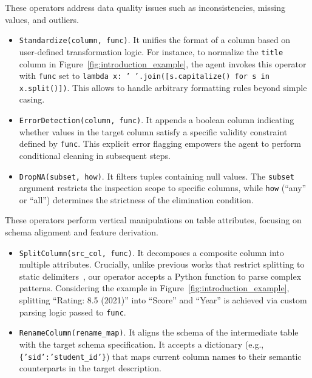  These operators address data quality issues such as inconsistencies, missing values, and outliers.
\begin{itemize}[leftmargin=1em]
    \item \texttt{Standardize(column, func)}. It unifies the format of a column based on user-defined transformation logic. For instance, to normalize the \texttt{title} column in Figure~\ref{fig:introduction_example}, the agent invokes this operator with \texttt{func} set to {\small\texttt{lambda x: ' '.join([s.capitalize() for s in x.split()])}}. This allows \sys to handle arbitrary formatting rules beyond simple casing.
    \item \texttt{ErrorDetection(column, func)}. It appends a boolean column indicating whether values in the target column satisfy a specific validity constraint defined by \texttt{func}. This explicit error flagging empowers the agent to perform conditional cleaning in subsequent steps.
    \item \texttt{DropNA(subset, how)}. It filters tuples containing null values. The \texttt{subset} argument restricts the inspection scope to specific columns, while \texttt{how} (``any'' or ``all'') determines the strictness of the elimination condition.
\end{itemize}


 These operators perform vertical manipulations on table attributes, focusing on schema alignment and feature derivation.
\begin{itemize}[leftmargin=1em]
    \item \texttt{SplitColumn(src\_col, func)}. It decomposes a composite column into multiple attributes. Crucially, unlike previous works that restrict splitting to static delimiters~\cite{yang2021auto}, our operator accepts a Python function to parse complex patterns. Considering the example in Figure~\ref{fig:introduction_example}, splitting ``Rating: 8.5 (2021)'' into ``Score'' and ``Year'' is achieved via custom parsing logic passed to \texttt{func}.
    \item \texttt{RenameColumn(rename\_map)}. It aligns the schema of the intermediate table with the target schema specification. It accepts a dictionary (e.g., {\small\texttt{\{'sid':'student\_id'\}}}) that maps current column names to their semantic counterparts in the target description.
\end{itemize}



